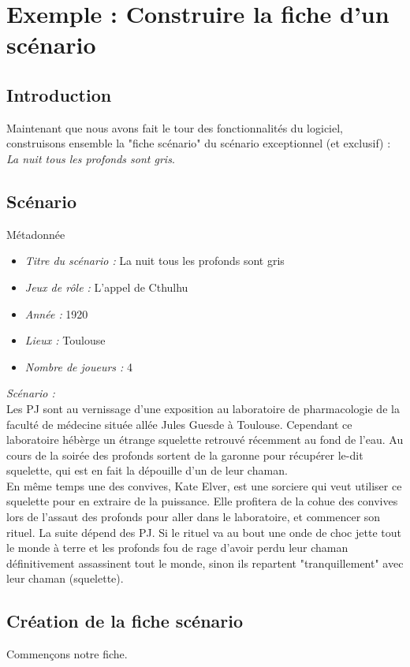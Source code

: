 \documentclass[a4paper,12pt]{article}
\begin{document}
\section{Exemple : Construire la fiche d'un scénario}
\subsection{Introduction}
Maintenant que nous avons fait le tour des fonctionnalités du logiciel, construisons ensemble la "fiche scénario" du scénario exceptionnel (et exclusif) : \emph{La nuit tous les profonds sont gris}.

\subsection{Scénario}
\label{exemple_scenario}
Métadonnée
\begin{itemize}
    \item \emph{Titre du scénario :} La nuit tous les profonds sont gris
    \item \emph{Jeux de rôle :} L'appel de Cthulhu
    \item \emph{Année :} 1920
    \item \emph{Lieux :} Toulouse
    \item \emph{Nombre de joueurs : } 4
\end{itemize}

\emph{Scénario :}\\ 
Les PJ sont au vernissage d'une exposition au laboratoire de pharmacologie de la faculté de médecine située allée Jules Guesde à Toulouse. Cependant ce laboratoire hébèrge  un étrange squelette retrouvé récemment au fond de l'eau. Au cours de la soirée des profonds sortent de la garonne pour récupérer le-dit squelette, qui est en fait la dépouille d'un de leur chaman.
\\
En même temps une des convives, Kate Elver, est une sorciere qui veut utiliser ce squelette pour en extraire de la puissance. Elle profitera de la cohue des convives lors de l'assaut des profonds pour aller dans le laboratoire, et commencer son rituel. La suite dépend des PJ. Si le rituel va au bout une onde de choc jette tout le monde à terre et les profonds fou de rage d'avoir perdu leur chaman définitivement assassinent tout le monde, sinon ils repartent "tranquillement" avec leur chaman (squelette).

\subsection{Création de la fiche scénario}
Commençons notre fiche.
\end{document}
